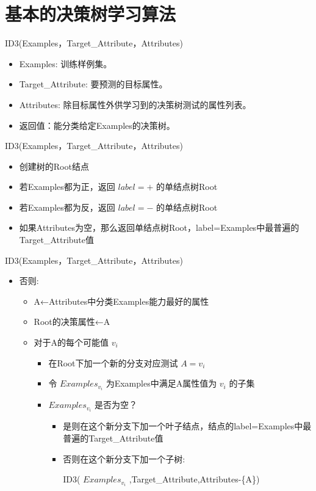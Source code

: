 \documentclass[presentation]{beamer}
\begin{document}
\section{基本的决策树学习算法}
\label{sec:org6bcb43a}
\begin{frame}[label={sec:orgd2cce7d}]{ID3(Examples，Target\_Attribute，Attributes)}
\begin{itemize}
\item Examples: 训练样例集。
\item Target\_Attribute: 要预测的目标属性。
\item Attributes: 除目标属性外供学习到的决策树测试的属性列表。
\item 返回值：能分类给定Examples的决策树。
\end{itemize}
\end{frame}
\begin{frame}[label={sec:org54282a7}]{ID3(Examples，Target\_Attribute，Attributes)}
\begin{itemize}
\item 创建树的Root结点
\item 若Examples都为正，返回 \(label =+\) 的单结点树Root
\item 若Examples都为反，返回 \(label =-\) 的单结点树Root
\item 如果Attributes为空，那么返回单结点树Root，label=Examples中最普遍的Target\_Attribute值
\end{itemize}
\end{frame}
\begin{frame}[label={sec:orgc04f602}]{ID3(Examples，Target\_Attribute，Attributes)}
\begin{itemize}
\item 否则:
\begin{itemize}
\item A←Attributes中分类Examples能力最好的属性
\item Root的决策属性←A
\item 对于A的每个可能值 \(v_i\)
\begin{itemize}
\item 在Root下加一个新的分支对应测试 \(A=v_i\)
\item 令 \(Examples_{v_i}\) 为Examples中满足A属性值为 \(v_i\) 的子集
\item \(Examples_{v_i}\) 是否为空？
\begin{itemize}
\item 是则在这个新分支下加一个叶子结点，结点的label=Examples中最普遍的Target\_Attribute值
\item 否则在这个新分支下加一个子树: 

ID3( \(Examples_{v_i}\) ,Target\_Attribute,Attributes-\{A\})
\end{itemize}
\end{itemize}
\end{itemize}
\end{itemize}
\end{frame}
\end{document}

